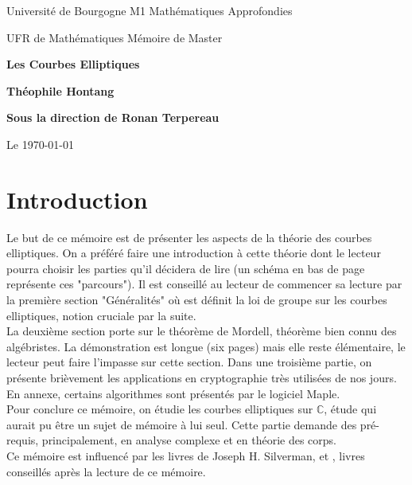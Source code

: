 \documentclass[a4paper]{article}
\begin{document}
\begin{center}
Universit\'e de Bourgogne  M1 Mathématiques Approfondies

UFR de Math\'ematiques  M\'emoire de Master
\end{center}


\begin{center}\bfseries\Huge
Les Courbes Elliptiques
\end{center}

\vspace*{1cm} %

\begin{center}\bfseries\Large
Théophile Hontang
\end{center}
\begin{center}\bfseries\Large
Sous la direction de Ronan Terpereau
\end{center}
\begin{center}
Le \today
\end{center}
\newpage
\null
\newpage
\begin{center}
\tableofcontents
\end{center}


\newpage
\section*{Introduction}

Le but de ce mémoire est de présenter les aspects de la théorie des courbes elliptiques.
On a préféré faire une introduction à cette théorie dont le lecteur pourra choisir les parties 
qu'il décidera de lire (un schéma en bas de page représente ces "parcours").
Il est conseillé au lecteur de commencer sa lecture par la première section "Généralités" où est définit la loi de groupe sur les courbes elliptiques, notion cruciale par la suite. \\
La deuxième section porte sur le théorème de Mordell, théorème bien connu des algébristes. La démonstration est longue (six pages) mais elle reste élémentaire, le lecteur peut faire l'impasse sur cette section.
Dans une troisième partie, on présente brièvement les applications en cryptographie très utilisées de nos jours. En annexe, certains algorithmes sont présentés par le logiciel Maple. \\
Pour conclure ce mémoire, on étudie les courbes elliptiques sur $\mathbb{C}$, étude qui aurait pu être un sujet de mémoire à lui seul. Cette partie demande des pré-requis, principalement, en analyse complexe et en théorie des corps. \\
Ce mémoire est influencé par les livres de Joseph H. Silverman\cite{ref},\cite{ref2} et \cite{ref8}, livres conseillés après la lecture de ce mémoire. \\ \\ \\
\end{document}
